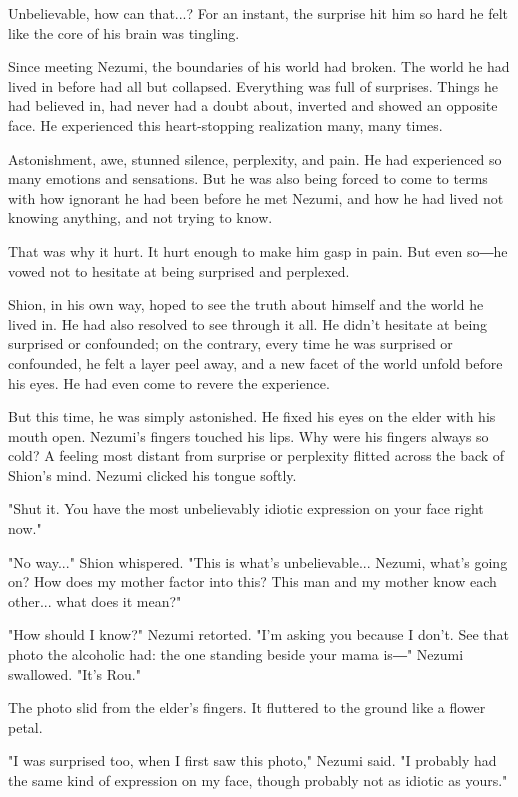 Unbelievable, how can that...? For an instant, the surprise hit him so
hard he felt like the core of his brain was tingling.

Since meeting Nezumi, the boundaries of his world had broken. The world
he had lived in before had all but collapsed. Everything was full of
surprises. Things he had believed in, had never had a doubt about,
inverted and showed an opposite face. He experienced this heart-stopping
realization many, many times.

Astonishment, awe, stunned silence, perplexity, and pain. He had
experienced so many emotions and sensations. But he was also being
forced to come to terms with how ignorant he had been before he met
Nezumi, and how he had lived not knowing anything, and not trying to
know.

That was why it hurt. It hurt enough to make him gasp in pain. But even
so―he vowed not to hesitate at being surprised and perplexed.

Shion, in his own way, hoped to see the truth about himself and the
world he lived in. He had also resolved to see through it all. He didn't
hesitate at being surprised or confounded; on the contrary, every time
he was surprised or confounded, he felt a layer peel away, and a new
facet of the world unfold before his eyes. He had even come to revere
the experience.

But this time, he was simply astonished. He fixed his eyes on the elder
with his mouth open. Nezumi's fingers touched his lips. Why were his
fingers always so cold? A feeling most distant from surprise or
perplexity flitted across the back of Shion's mind. Nezumi clicked his
tongue softly.

"Shut it. You have the most unbelievably idiotic expression on your face
right now."

"No way..." Shion whispered. "This is what's unbelievable... Nezumi,
what's going on? How does my mother factor into this? This man and my
mother know each other... what does it mean?"

"How should I know?" Nezumi retorted. "I'm asking you because I don't.
See that photo the alcoholic had: the one standing beside your mama is―"
Nezumi swallowed. "It's Rou."

The photo slid from the elder's fingers. It fluttered to the ground like
a flower petal.

"I was surprised too, when I first saw this photo," Nezumi said. "I
probably had the same kind of expression on my face, though probably not
as idiotic as yours."

